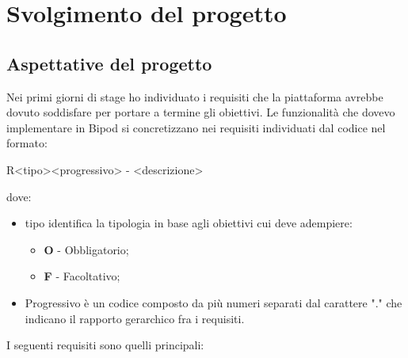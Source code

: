 
\chapter{Svolgimento del progetto}
\label{cap:modalita-svolgimento}
\section{Aspettative del progetto}
\label{sec:aspettative}
Nei primi giorni di stage ho individuato i requisiti che la piattaforma avrebbe dovuto soddisfare per portare a termine gli obiettivi.
Le funzionalità che dovevo implementare in Bipod si concretizzano nei requisiti individuati dal codice nel formato:
\begin{center}
    \noindent R<tipo><progressivo> - <descrizione>
\end{center}
dove:
\begin{itemize}
    \item tipo identifica la tipologia in base agli obiettivi cui deve adempiere:
    \begin{itemize}
        \item \textbf{O} - Obbligatorio;
        \item \textbf{F} - Facoltativo;
    \end{itemize}
    \item Progressivo è un codice composto da più numeri separati dal carattere "." che indicano il rapporto gerarchico fra i requisiti.
\end{itemize}
I seguenti requisiti sono quelli principali:
